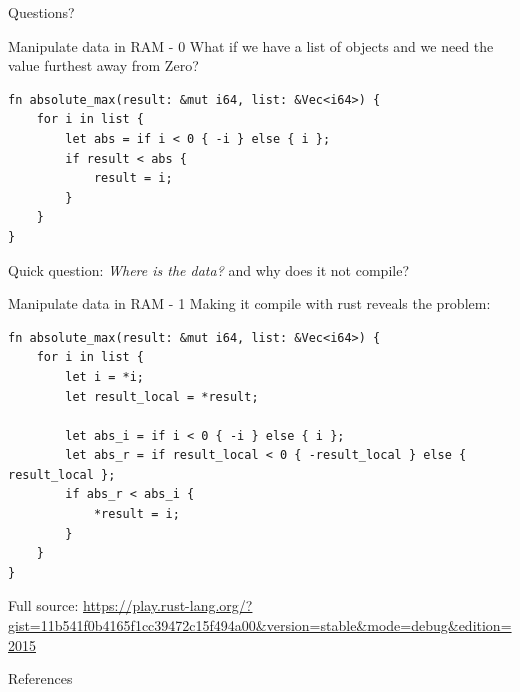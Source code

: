 \documentclass[10pt,aspectratio=169]{beamer}
\newcommand{\themename}{\textbf{\textsc{metropolis}}\xspace}
\begin{document}
{
\begin{frame}[standout]
  Questions?
\end{frame}
}

\appendix

%
%


\begin{frame}[fragile]{Manipulate data in RAM - 0}
What if we have a list of objects and we need the value furthest away from Zero?
\begin{verbatim}
fn absolute_max(result: &mut i64, list: &Vec<i64>) {
    for i in list {
        let abs = if i < 0 { -i } else { i };
        if result < abs {
            result = i;
        }
    }
}
\end{verbatim}
Quick question: \emph{Where is the data?} and why does it \alert{not} compile?
\end{frame}

\begin{frame}[fragile]{Manipulate data in RAM - 1}
Making it compile with rust reveals the problem:
\begin{verbatim}
fn absolute_max(result: &mut i64, list: &Vec<i64>) {
    for i in list {
        let i = *i;
        let result_local = *result;

        let abs_i = if i < 0 { -i } else { i };
        let abs_r = if result_local < 0 { -result_local } else { result_local };
        if abs_r < abs_i {
            *result = i;
        }
    }
}
\end{verbatim}
Full source: \url{https://play.rust-lang.org/?gist=11b541f0b4165f1cc39472c15f494a00&version=stable&mode=debug&edition=2015}
\end{frame}

\begin{frame}[allowframebreaks]{References}

  
  

\end{frame}
\end{document}
